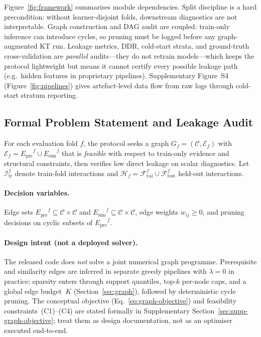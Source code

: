\documentclass[pdflatex,sn-mathphys-num]{sn-jnl}
\newcommand{\Epre}{\ensuremath{E_{\text{pre}}}}
\newcommand{\Esim}{\ensuremath{E_{\text{sim}}}}
\newcommand{\DDR}{\textsc{DDR}}
\begin{document}
Figure~\ref{fig:framework} summarises module dependencies. Split
discipline is a hard precondition: without learner-disjoint folds,
downstream diagnostics are not interpretable. Graph construction and DAG
audit are coupled: train-only inference can introduce cycles, so pruning
must be logged before any graph-augmented KT run. Leakage metrics,
\DDR{}, cold-start strata, and ground-truth cross-validation are
\emph{parallel} audits---they do not retrain models---which keeps the
protocol lightweight but means it cannot certify every possible leakage
path (e.g.\ hidden features in proprietary pipelines).
Supplementary Figure~S4 (Figure~\ref{fig:pipelines}) gives artefact-level data
flow from raw logs through cold-start stratum reporting.

\subsection{Formal Problem Statement and Leakage Audit}
\label{sec:formal-problem}
For each evaluation fold $f$, the protocol seeks a graph
$G_f=(\mathcal{C},\mathcal{E}_f)$ with $\mathcal{E}_f=\Epre^f\cup\Esim^f$
that is \emph{feasible} with respect to train-only evidence and
structural constraints, then verifies low direct leakage on scalar
diagnostics. Let $\mathcal{I}_{\text{tr}}^f$ denote train-fold
interactions and $\mathcal{H}_f=\mathcal{F}_{\text{val}}^f\cup
\mathcal{F}_{\text{test}}^f$ held-out interactions.

\paragraph{Decision variables.}
Edge sets $\Epre^f\subseteq\mathcal{C}\times\mathcal{C}$ and
$\Esim^f\subseteq\mathcal{C}\times\mathcal{C}$, edge weights
$w_{ij}\ge 0$, and pruning decisions on cyclic subsets of $\Epre^f$.

\paragraph{Design intent (not a deployed solver).}
The released code does \emph{not} solve a joint numerical graph programme.
Prerequisite and similarity edges are inferred in separate greedy pipelines with
$\lambda{=}0$ in practice; sparsity enters through support quantiles, top-$k$
per-node caps, and a global edge budget~$K$ (Section~\ref{sec:graph}), followed
by deterministic cycle pruning. The conceptual objective
(Eq.~\eqref{eq:graph-objective}) and feasibility constraints~(C1)--(C4) are
stated formally in Supplementary Section~\ref{sec:supp-graph-objective}; treat
them as design documentation, not as an optimiser executed end-to-end.
\end{document}
